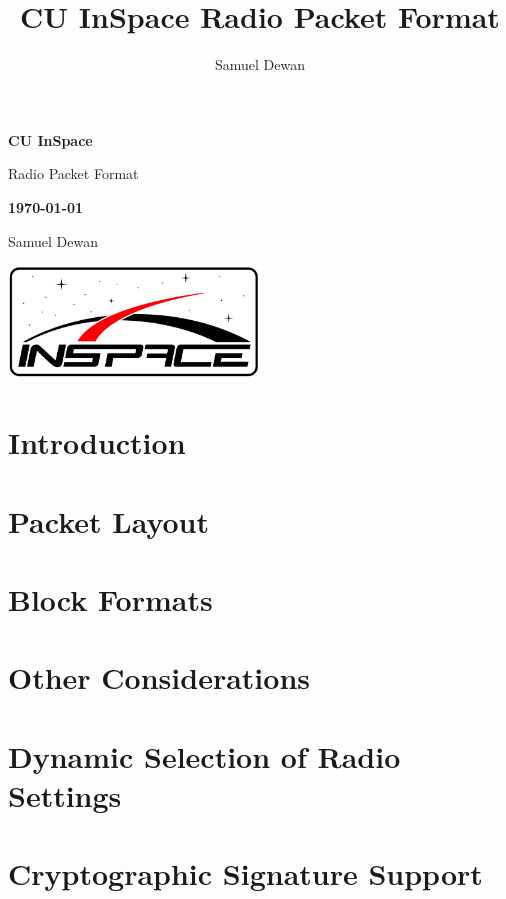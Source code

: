 \documentclass[11pt,letterpaper]{article}
\title{CU InSpace Radio Packet Format}
\author{Samuel Dewan}
\begin{document}
\frenchspacing

\begin{titlepage}
\centering

{\large \textbf{CU InSpace}}

{\Huge \sffamily Radio Packet Format}

{\large \textbf{\today}}

Samuel Dewan

\includegraphics[width=0.5\textwidth]{logo.png}

\end{titlepage}

\tableofcontents
\clearpage
{}

\section{Introduction}
\label{sec:introduction}

\clearpage

\section{Packet Layout}
\label{sec:packet-layout}

\clearpage

\section{Block Formats}
\label{sec:block-formats}

\clearpage

\section{Other Considerations}
\label{sec:other-considerations}

\clearpage

\section{Dynamic Selection of Radio Settings}
\label{sec:dynamic-settings}

\clearpage

\section{Cryptographic Signature Support}
\label{sec:signatures}

\end{document}
